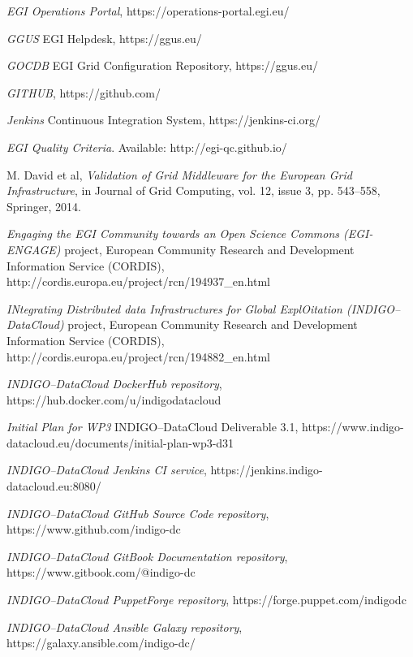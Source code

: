 \documentclass[journal]{IEEEtran}
\begin{document}
\begin{thebibliography}{1}
\emph{EGI Operations Portal},
https://operations-portal.egi.eu/

\emph{GGUS} EGI Helpdesk,
https://ggus.eu/

\emph{GOCDB} EGI Grid Configuration Repository,
https://ggus.eu/

\emph{GITHUB},
https://github.com/

\emph{Jenkins} Continuous Integration System,
https://jenkins-ci.org/

\emph{EGI Quality Criteria}. Available: http://egi-qc.github.io/

M. David et al, \emph{Validation of Grid Middleware for the European Grid
Infrastructure}, in Journal of Grid Computing, vol. 12, issue 3, pp. 543–558,
Springer, 2014.

\emph{Engaging the EGI Community towards an Open Science Commons (EGI-ENGAGE)}
project, European Community Research and Development Information Service
(CORDIS), http://cordis.europa.eu/project/rcn/194937\_en.html

\emph{INtegrating Distributed data Infrastructures for Global ExplOitation
(INDIGO--DataCloud)} project, European Community Research and Development
Information Service (CORDIS),
http://cordis.europa.eu/project/rcn/194882\_en.html

\emph{INDIGO--DataCloud DockerHub repository},
https://hub.docker.com/u/indigodatacloud

\emph{Initial Plan for WP3} INDIGO--DataCloud Deliverable 3.1,
https://www.indigo-datacloud.eu/documents/initial-plan-wp3-d31

\emph{INDIGO--DataCloud Jenkins CI service},
https://jenkins.indigo-datacloud.eu:8080/

\emph{INDIGO--DataCloud GitHub Source Code repository},
https://www.github.com/indigo-dc

\emph{INDIGO--DataCloud GitBook Documentation repository},
https://www.gitbook.com/@indigo-dc

\emph{INDIGO--DataCloud PuppetForge repository},
https://forge.puppet.com/indigodc

\emph{INDIGO--DataCloud Ansible Galaxy repository},
https://galaxy.ansible.com/indigo-dc/


\end{thebibliography}
\end{document}
